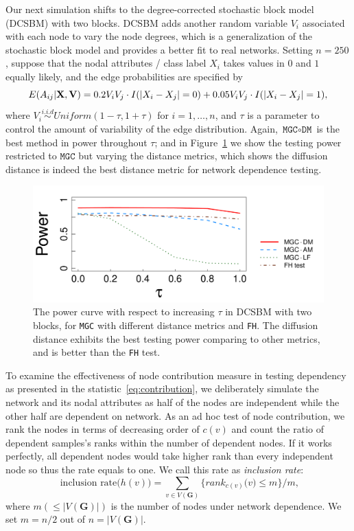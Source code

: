 \documentclass[11pt]{article}
\theoremstyle{definition}
\begin{document}
Our next simulation shifts to the degree-corrected stochastic block model (DCSBM) with two blocks. DCSBM adds another random variable $V_{i}$ associated with each node to vary the node degrees, which is a generalization of the stochastic block model and provides a better fit to real networks. Setting $n=250$, suppose that the nodal attributes / class label $X_i$ takes values in $0$ and $1$ equally likely, and the edge probabilities are specified by  
\vspace*{-0.4cm}
\begin{equation}
E( A_{ij} | \mathbf{X}, \mathbf{V} )  = 0.2 V_{i} V_{j} \cdot I ( |X_{i} - X_{j}| = 0 ) + 0.05 V_{i} V_{j} \cdot I(|X_{i} - X_{j}| = 1),
\label{eq:tau}
\vspace*{-0.4cm}
\end{equation} 
where $V_{i} \overset{i.i.d}{\sim} Uniform(1 - \tau, 1 + \tau)$ for $i = 1, \ldots, n$, and $\tau$ is a parameter to control the amount of variability of the edge distribution. Again, $\texttt{MGC} \circ \texttt{DM}$ is the best method in power throughout $\tau$; and in Figure~\ref{fig:dcSBM} we show the testing power restricted to $\texttt{MGC}$ but varying the distance metrics, which shows the diffusion distance is indeed the best distance metric for network dependence testing.

\begin{figure}[ht]
	\centering
	\includegraphics[width=0.7\linewidth]{tau_short.pdf}
	\caption{The power curve with respect to increasing $\tau$ in DCSBM with two blocks, for \texttt{MGC} with different distance metrics and \texttt{FH}. The diffusion distance exhibits the best testing power comparing to other metrics, and is better than the \texttt{FH} test.}
	\label{fig:dcSBM}
	\vspace*{-0.5cm}
\end{figure}
To examine the effectiveness of node contribution measure in testing dependency as presented in the statistic~\ref{eq:contribution}, we deliberately simulate the network and its nodal attributes as half of the nodes are independent while the other half are dependent on network. As an ad hoc test of node contribution, we rank the nodes in terms of decreasing order of $c(v)$ and count the ratio of dependent samples's ranks within the number of dependent nodes. If it works perfectly, all dependent nodes would take higher rank than every independent node so thus the rate equals to one. We call this rate as \textit{inclusion rate}:
\begin{equation}
\mbox{ inclusion rate}\big(  h(v) \big) = \sum\limits_{v \in V(\mathbf{G})} \big\{  rank_{c(v)}\big(  v \big)  \leq  m  \big\}   /  m,
\label{eq:inclusion_rate}
\end{equation}
where $m (\leq |V(\mathbf{G})|)$ is the number of nodes under network dependence. We set $m=n/2$ out of $n = |V(\mathbf{G})|$.
\end{document}
